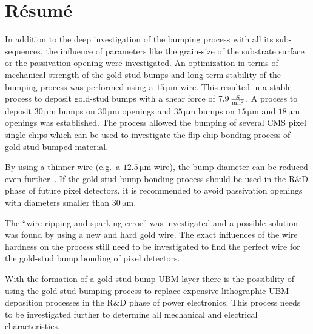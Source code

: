 \section{R\'{e}sum\'{e}}
In addition to the deep investigation of the bumping process with all its sub-sequences, the influence of parameters like the grain-size of the substrate surface or the passivation opening were investigated. An optimization in terms of mechanical strength of the gold-stud bumps and long-term stability of the bumping process was performed using a $15\,\si{\micro \meter}$ wire. This resulted in a stable process to deposit gold-stud bumps with a shear force of $7.9\,\frac{\rm{g}}{\rm{mil}^2}$. A process to deposit $30\,\si{\micro \meter}$ bumps on $30\,\si{\micro \meter}$ openings and $35\,\si{\micro \meter}$ bumps on $15\,\si{\micro \meter}$ and $18\,\si{\micro \meter}$ openings was established. The process allowed the bumping of several \ac{CMS} pixel single chips which can be used to investigate the flip-chip bonding process of gold-stud bumped material.

By using a thinner wire (e.g.~a $12.5\,\si{\micro \meter}$ wire), the bump diameter can be reduced even further~\cite{Hei12}. If the gold-stud bump bonding process should be used in the R$\&$D phase of future pixel detectors, it is recommended to avoid passivation openings with diameters smaller than $30\,\si{\micro \meter}$.

The ``wire-ripping and sparking error'' was investigated and a possible solution was found by using a new and hard gold wire. The exact influences of the wire hardness on the process still need to be investigated to find the perfect wire for the gold-stud bump bonding of pixel detectors.

With the formation of a gold-stud bump \ac{UBM} layer there is the possibility of using the gold-stud bumping process to replace expensive lithographic \ac{UBM} deposition processes in the R$\&$D phase of power electronics. This process needs to be investigated further to determine all mechanical and electrical characteristics.
